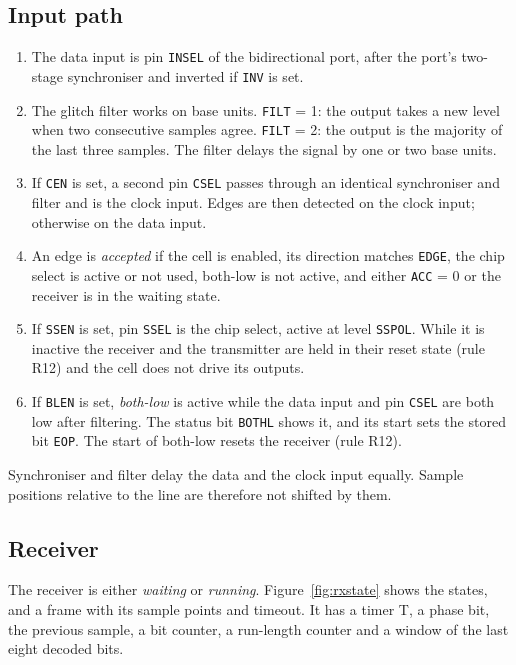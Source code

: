 \documentclass[10pt,a4paper]{article}
\newcommand{\reg}[1]{\texttt{#1}}
\begin{document}
\subsection{Input path}

\begin{enumerate}[label=\textbf{I\arabic*},leftmargin=2.6em]
\item The data input is pin \reg{INSEL} of the bidirectional port, after the port's two-stage synchroniser and
inverted if \reg{INV} is set.
\item The glitch filter works on base units. \reg{FILT} = 1: the output takes a new level when two consecutive
samples agree. \reg{FILT} = 2: the output is the majority of the last three samples. The filter delays the
signal by one or two base units.
\item If \reg{CEN} is set, a second pin \reg{CSEL} passes through an identical synchroniser and filter and is the
clock input. Edges are then detected on the clock input; otherwise on the data input.
\item An edge is \emph{accepted} if the cell is enabled, its direction matches \reg{EDGE}, the chip select is active
or not used, both-low is not active, and either \reg{ACC} = 0 or the receiver is in the waiting state.
\item If \reg{SSEN} is set, pin \reg{SSEL} is the chip select, active at level \reg{SSPOL}. While it is inactive the
receiver and the transmitter are held in their reset state (rule R12) and the cell does not drive its outputs.
\item If \reg{BLEN} is set, \emph{both-low} is active while the data input and pin \reg{CSEL} are both low after
filtering. The status bit \reg{BOTHL} shows it, and its start sets the stored bit \reg{EOP}. The start of both-low resets the receiver (rule R12).
\end{enumerate}

Synchroniser and filter delay the data and the clock input equally. Sample positions relative to the line are
therefore not shifted by them.

\subsection{Receiver}

The receiver is either \emph{waiting} or \emph{running}. Figure~\ref{fig:rxstate} shows the states, and a frame with its sample points and timeout. It has a timer T, a phase bit, the previous sample, a bit
counter, a run-length counter and a window of the last eight decoded bits.
\end{document}

